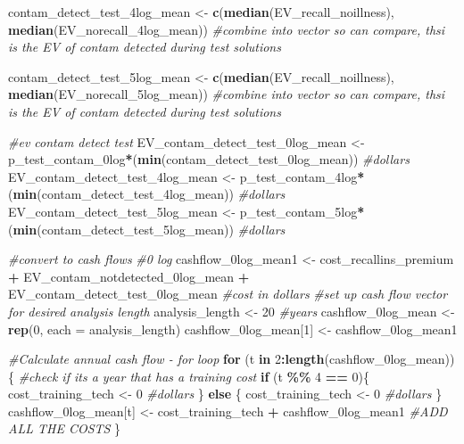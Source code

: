 \documentclass[
]{article}
\newenvironment{Shaded}{\begin{snugshade}}{\end{snugshade}}
\newcommand{\AttributeTok}[1]{\textcolor[rgb]{0.13,0.29,0.53}{#1}}
\newcommand{\CommentTok}[1]{\textcolor[rgb]{0.56,0.35,0.01}{\textit{#1}}}
\newcommand{\ControlFlowTok}[1]{\textcolor[rgb]{0.13,0.29,0.53}{\textbf{#1}}}
\newcommand{\DecValTok}[1]{\textcolor[rgb]{0.00,0.00,0.81}{#1}}
\newcommand{\FunctionTok}[1]{\textcolor[rgb]{0.13,0.29,0.53}{\textbf{#1}}}
\newcommand{\NormalTok}[1]{#1}
\newcommand{\OtherTok}[1]{\textcolor[rgb]{0.56,0.35,0.01}{#1}}
\newcommand{\SpecialCharTok}[1]{\textcolor[rgb]{0.81,0.36,0.00}{\textbf{#1}}}
\begin{document}
\begin{Shaded}
\begin{Highlighting}[]
\NormalTok{contam\_detect\_test\_4log\_mean }\OtherTok{\textless{}{-}} \FunctionTok{c}\NormalTok{(}\FunctionTok{median}\NormalTok{(EV\_recall\_noillness), }\FunctionTok{median}\NormalTok{(EV\_norecall\_4log\_mean)) }\CommentTok{\#combine into vector so can compare, thsi is the EV of contam detected during test solutions}

\NormalTok{contam\_detect\_test\_5log\_mean }\OtherTok{\textless{}{-}} \FunctionTok{c}\NormalTok{(}\FunctionTok{median}\NormalTok{(EV\_recall\_noillness), }\FunctionTok{median}\NormalTok{(EV\_norecall\_5log\_mean)) }\CommentTok{\#combine into vector so can compare, thsi is the EV of contam detected during test solutions}


\CommentTok{\#ev contam detect test}
\NormalTok{EV\_contam\_detect\_test\_0log\_mean }\OtherTok{\textless{}{-}}\NormalTok{ p\_test\_contam\_0log}\SpecialCharTok{*}\NormalTok{(}\FunctionTok{min}\NormalTok{(contam\_detect\_test\_0log\_mean)) }\CommentTok{\#dollars}
\NormalTok{EV\_contam\_detect\_test\_4log\_mean }\OtherTok{\textless{}{-}}\NormalTok{ p\_test\_contam\_4log}\SpecialCharTok{*}\NormalTok{(}\FunctionTok{min}\NormalTok{(contam\_detect\_test\_4log\_mean)) }\CommentTok{\#dollars}
\NormalTok{EV\_contam\_detect\_test\_5log\_mean }\OtherTok{\textless{}{-}}\NormalTok{ p\_test\_contam\_5log}\SpecialCharTok{*}\NormalTok{(}\FunctionTok{min}\NormalTok{(contam\_detect\_test\_5log\_mean)) }\CommentTok{\#dollars}


\CommentTok{\#convert to cash flows}
\CommentTok{\#0 log}
\NormalTok{cashflow\_0log\_mean1 }\OtherTok{\textless{}{-}}\NormalTok{ cost\_recallins\_premium }\SpecialCharTok{+}\NormalTok{ EV\_contam\_notdetected\_0log\_mean }\SpecialCharTok{+}\NormalTok{ EV\_contam\_detect\_test\_0log\_mean }\CommentTok{\#cost in dollars}
\CommentTok{\#set up cash flow vector for desired analysis length}
\NormalTok{analysis\_length }\OtherTok{\textless{}{-}} \DecValTok{20} \CommentTok{\#years}
\NormalTok{cashflow\_0log\_mean }\OtherTok{\textless{}{-}} \FunctionTok{rep}\NormalTok{(}\DecValTok{0}\NormalTok{, }\AttributeTok{each =}\NormalTok{ analysis\_length)}
\NormalTok{cashflow\_0log\_mean[}\DecValTok{1}\NormalTok{] }\OtherTok{\textless{}{-}}\NormalTok{ cashflow\_0log\_mean1}

\CommentTok{\#Calculate annual cash flow {-} for loop}
\ControlFlowTok{for}\NormalTok{ (t }\ControlFlowTok{in} \DecValTok{2}\SpecialCharTok{:}\FunctionTok{length}\NormalTok{(cashflow\_0log\_mean))\{}
  \CommentTok{\#check if it\textquotesingle{}s a year that has a training cost}
  \ControlFlowTok{if}\NormalTok{ (t }\SpecialCharTok{\%\%} \DecValTok{4} \SpecialCharTok{==} \DecValTok{0}\NormalTok{)\{}
\NormalTok{    cost\_training\_tech }\OtherTok{\textless{}{-}} \DecValTok{0} \CommentTok{\#dollars}
\NormalTok{  \} }\ControlFlowTok{else}\NormalTok{ \{}
\NormalTok{    cost\_training\_tech }\OtherTok{\textless{}{-}} \DecValTok{0} \CommentTok{\#dollars}
\NormalTok{  \}}
\NormalTok{  cashflow\_0log\_mean[t] }\OtherTok{\textless{}{-}}\NormalTok{ cost\_training\_tech }\SpecialCharTok{+}\NormalTok{ cashflow\_0log\_mean1 }\CommentTok{\#ADD ALL THE COSTS}
\NormalTok{\}}



\end{Highlighting}
\end{Shaded}
\end{document}

